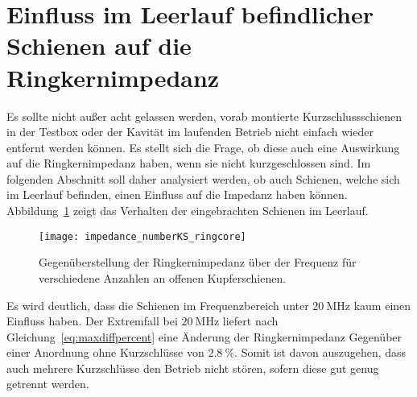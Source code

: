 \section{Einfluss im Leerlauf befindlicher Schienen auf die Ringkernimpedanz}
Es sollte nicht au\ss{}er acht gelassen werden, vorab montierte Kurzschlussschienen in der Testbox oder der Kavit\"at im laufenden Betrieb nicht einfach wieder entfernt werden k\"onnen. Es stellt sich die Frage, ob diese auch eine Auswirkung auf die Ringkernimpedanz haben, wenn sie nicht kurzgeschlossen sind. Im folgenden Abschnitt soll daher analysiert werden, ob auch Schienen, welche sich im Leerlauf befinden, einen Einfluss auf die Impedanz haben k\"onnen. Abbildung~\ref{fig:openksnumber} zeigt das Verhalten der eingebrachten Schienen im Leerlauf.
\begin{figure}[htb]
	\centering
	\texttt{[image: impedance\_numberKS\_ringcore]}
	\caption{Gegen\"uberstellung der Ringkernimpedanz \"uber der Frequenz f\"ur verschiedene Anzahlen an offenen Kupferschienen.}
	\label{fig:openksnumber}
\end{figure}
\par
Es wird deutlich, dass die Schienen im Frequenzbereich unter $\SI{20}{\mega\hertz}$ kaum einen Einfluss haben. Der Extremfall bei $\SI{20}{\mega\hertz}$ liefert nach Gleichung~\ref{eq:maxdiffpercent} eine \"Anderung der Ringkernimpedanz Gegen\"uber einer Anordnung ohne Kurzschl\"usse von $\SI{2,8}{\%}$. Somit ist davon auszugehen, dass auch mehrere Kurzschl\"usse den Betrieb nicht st\"oren, sofern diese gut genug getrennt werden.